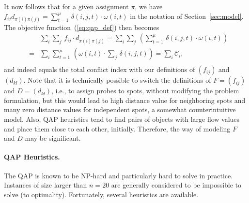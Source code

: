 \documentclass[english]{lni}
\newcommand{\ignore}[1]{}
\begin{document}
It now follows that for a given assignment $\pi$, we have
$f_{ij} d_{\pi(i)\pi(j)} = \sum_{t=1}^\mu\, \delta(i,j,t) \cdot \omega(i,t)$
in the notation of Section~\ref{sec:model}. The objective
function~(\ref{eq:qap_def}) then becomes
\begin{eqnarray*}
  & & \sum_i \sum_j\, f_{ij} \cdot d_{\pi(i)\pi(j)} = \sum_i \sum_j\, \left( \sum_{t=1}^\mu\, \delta(i,j,t) \cdot \omega(i,t) \right)\\
  &=& \sum_i \sum_{t=1}^\mu\, \left( \omega(i,t) \cdot \sum_j\, \delta(i,j,t) \right) = \sum_i \mathcal{C}_i,\\
\end{eqnarray*}
and indeed equals the total conflict index with our definitions of $(f_{ij})$
and $(d_{kl})$.
Note that it is technically possible to switch the definitions of $F=(f_{ij})$
and $D=(d_{kl})$, i.e., to assign probes to spots, without modifying the
problem formulation, but this would lead to high distance value for
neighboring spots and many zero distance values for independent spots, a somewhat
counterintuitive model. Also, QAP heuristics tend to find pairs of objects with
large flow values and place them close to each other, initially. Therefore, the
way of modeling $F$ and $D$ may be significant.

\paragraph{QAP Heuristics.}
\ignore{
In the previous sub-section we showed how the microarray placement problem can
be modeled as a quadratic assignment problem. This is interesting because we can
now use existing QAP algorithms to design the layout of microarrays minimizing
either the sum of border lengths or conflict indices. 
}
The QAP is known to be NP-hard and particularly hard to solve in practice.
Instances of size
larger than $n = 20$ are generally considered to be impossible to solve (to
optimality). Fortunately, several heuristics are available.

\ignore{
including
approaches based on tabu search, simulated annealing and genetic algorithms
(see \cite{CELA98}, for a survey).
}
\end{document}
